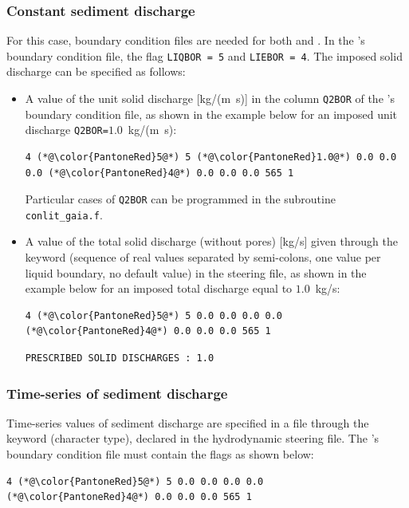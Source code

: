 \subsubsection{Constant sediment discharge}
For this case, boundary condition files are needed for both  and \gaia{}. In the \gaia{}'s boundary condition file, the flag \texttt{LIQBOR = 5} and \texttt{LIEBOR = 4}. The imposed solid discharge can be specified as follows:
\begin{itemize}
\item A value of the unit solid discharge [kg/(m~s)] in the column \texttt{Q2BOR} of the \gaia{}'s boundary condition file, as shown in the example below for an imposed unit discharge \texttt{Q2BOR=}$1.0$~kg/(m~s):
\begin{lstlisting}[frame=trBL]
4 (*@\color{PantoneRed}5@*) 5 (*@\color{PantoneRed}1.0@*) 0.0 0.0 0.0 (*@\color{PantoneRed}4@*) 0.0 0.0 0.0 565 1
\end{lstlisting}

Particular cases of \texttt{Q2BOR} can be programmed in the subroutine \texttt{conlit\_gaia.f}.

\item A value of the total solid discharge (without pores) [kg/s] given through the keyword  (sequence of real values separated by semi-colons, one value per liquid boundary, no default value) in the steering file, as shown in the example below for an imposed total discharge equal to $1.0$~kg/s:
\begin{lstlisting}[frame=trBL]
4 (*@\color{PantoneRed}5@*) 5 0.0 0.0 0.0 0.0 (*@\color{PantoneRed}4@*) 0.0 0.0 0.0 565 1
\end{lstlisting}

\begin{lstlisting}[frame=trBL]
PRESCRIBED SOLID DISCHARGES : 1.0
\end{lstlisting}

\end{itemize}

\subsubsection{Time-series of sediment discharge}
Time-series values of sediment discharge are specified in a file through the keyword  (character type), declared in the hydrodynamic steering file. The \gaia{}'s boundary condition file must contain the flags as shown below:
\begin{lstlisting}[frame=trBL]
4 (*@\color{PantoneRed}5@*) 5 0.0 0.0 0.0 0.0 (*@\color{PantoneRed}4@*) 0.0 0.0 0.0 565 1
\end{lstlisting}

